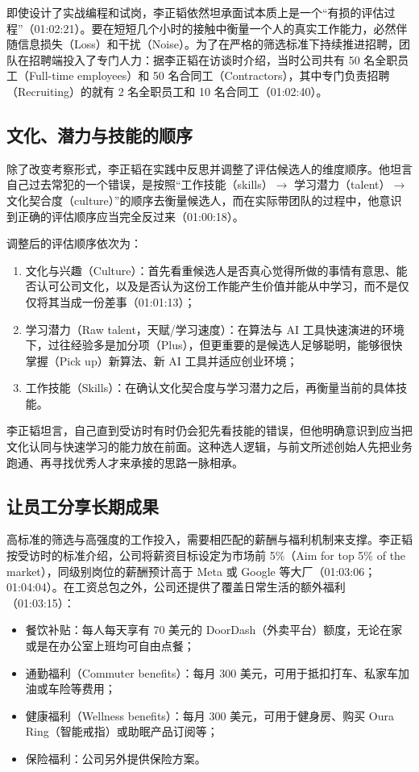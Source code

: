 \documentclass[UTF8,a4paper,11pt,fontset=fandol]{ctexart}
\begin{document}
即使设计了实战编程和试岗，李正韬依然坦承面试本质上是一个“有损的评估过程”（01:02:21）。要在短短几个小时的接触中衡量一个人的真实工作能力，必然伴随信息损失（Loss）和干扰（Noise）。为了在严格的筛选标准下持续推进招聘，团队在招聘端投入了专门人力：据李正韬在访谈时介绍，当时公司共有 50 名全职员工（Full-time employees）和 50 名合同工（Contractors），其中专门负责招聘（Recruiting）的就有 2 名全职员工和 10 名合同工（01:02:40）。

\subsection{文化、潜力与技能的顺序}
除了改变考察形式，李正韬在实践中反思并调整了评估候选人的维度顺序。他坦言自己过去常犯的一个错误，是按照“工作技能（skills）\ensuremath{\rightarrow} 学习潜力（talent）\ensuremath{\rightarrow} 文化契合度（culture）”的顺序去衡量候选人，而在实际带团队的过程中，他意识到正确的评估顺序应当完全反过来（01:00:18）。

调整后的评估顺序依次为：
\begin{enumerate}
\item 文化与兴趣（Culture）：首先看重候选人是否真心觉得所做的事情有意思、能否认可公司文化，以及是否认为这份工作能产生价值并能从中学习，而不是仅仅将其当成一份差事（01:01:13）；
\item 学习潜力（Raw talent，天赋/学习速度）：在算法与 AI 工具快速演进的环境下，过往经验多是加分项（Plus），但更重要的是候选人足够聪明，能够很快掌握（Pick up）新算法、新 AI 工具并适应创业环境；
\item 工作技能（Skills）：在确认文化契合度与学习潜力之后，再衡量当前的具体技能。
\end{enumerate}

李正韬坦言，自己直到受访时有时仍会犯先看技能的错误，但他明确意识到应当把文化认同与快速学习的能力放在前面。这种选人逻辑，与前文所述创始人先把业务跑通、再寻找优秀人才来承接的思路一脉相承。

\subsection{让员工分享长期成果}
高标准的筛选与高强度的工作投入，需要相匹配的薪酬与福利机制来支撑。李正韬按受访时的标准介绍，公司将薪资目标设定为市场前 5\%（Aim for top 5\% of the market），同级别岗位的薪酬预计高于 Meta 或 Google 等大厂（01:03:06；01:04:04）。在工资总包之外，公司还提供了覆盖日常生活的额外福利（01:03:15）：
\begin{itemize}
\item 餐饮补贴：每人每天享有 70 美元的 DoorDash（外卖平台）额度，无论在家或是在办公室上班均可自由点餐；
\item 通勤福利（Commuter benefits）：每月 300 美元，可用于抵扣打车、私家车加油或车险等费用；
\item 健康福利（Wellness benefits）：每月 300 美元，可用于健身房、购买 Oura Ring（智能戒指）或助眠产品订阅等；
\item 保险福利：公司另外提供保险方案。
\end{itemize}
\end{document}
